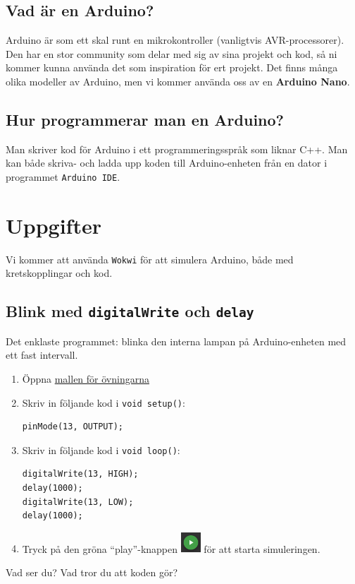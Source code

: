 \documentclass[11pt]{article}
\newcommand{\mallurl}{https://wokwi.com/projects/357812594927244289}
\begin{document}
\subsection{Vad är en Arduino?}
Arduino är som ett skal runt en mikrokontroller (vanligtvis AVR-processorer).
Den har en stor community som delar med sig av sina projekt och kod, så ni
kommer kunna använda det som inspiration för ert projekt. Det finns många olika
modeller av Arduino, men vi kommer använda oss av en \textbf{Arduino Nano}.

\subsection{Hur programmerar man en Arduino?}
Man skriver kod för Arduino i ett programmeringsspråk som liknar C++. Man kan
både skriva- och ladda upp koden till Arduino-enheten från en dator i
programmet \texttt{Arduino IDE}.

\newpage
\onehalfspacing
\section{Uppgifter}
Vi kommer att använda \texttt{Wokwi} för att simulera Arduino, både med
kretskopplingar och kod.
\subsection{Blink med \texttt{digitalWrite} och \texttt{delay}}\label{sec:blink}
Det enklaste programmet: blinka den interna lampan på Arduino-enheten med ett
fast intervall.

\begin{enumerate}[itemsep=1em]
      \item
            Öppna \href{\mallurl}{mallen för övningarna}
      \item
            Skriv in följande kod i \texttt{void setup()}:

            \begin{lstlisting}
pinMode(13, OUTPUT);
       \end{lstlisting}
      \item
            Skriv in följande kod i \texttt{void loop()}:

            \begin{lstlisting}
digitalWrite(13, HIGH);
delay(1000);
digitalWrite(13, LOW);
delay(1000);
       \end{lstlisting}
      \item
            Tryck på den gröna ``play''-knappen
            \includegraphics[width=2em,valign=c]{play} för att starta
            simuleringen.
\end{enumerate}
\vspace{1em}
Vad ser du? Vad tror du att koden gör?
\end{document}
